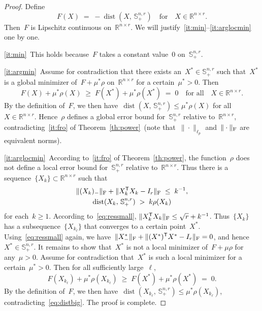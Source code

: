 \documentclass[11pt,a4paper]{article}  %
\theoremstyle{definition}
\DeclareMathOperator{\dist}{dist}
\newcommand{\RR}{\mathbb{R}}
\newcommand{\res}{\rho}
\newcommand{\penpar}{\mu}
\newcommand{\col}{r}
\newcommand{\stf}[1]{\mathbb{S}^{#1}}
\newcommand{\fro}{{\scriptstyle{\textnormal{F}}}}
\newcommand{\trs}{{\scriptstyle{\mathsf{T}}}}
\begin{document}
\begin{proof}
    Define
    \begin{equation}
        \nonumber
        F(X) \;=\; -\dist(X,\,\stf{n,\col}_+) \quad \text{for} \quad X\in\RR^{n\times \col}.
    \end{equation}
    Then~$F$ is Lipschitz continuous on~$\RR^{n\times\col}$. We will
    justify~\ref{it:min}--\ref{it:arglocmin} one by one.

    \ref{it:min}~This holds because~$F$ takes a constant value~$0$ on~$\stf{n,\col}_+$.

    \ref{it:argmin}~Assume for contradiction that there exists an~$X^*\in\stf{n,\col}_+$ such
    that~$X^*$ is a global minimizer of~$F + \penpar^* \res$ on~$\RR^{n\times \col}$
    for a certain~$\penpar^* >0$. Then
    \begin{equation}
        \nonumber
        F(X) + \penpar^* \res(X) \;\ge\; F(X^*) + \penpar^*\res(X^*) \;=\; 0
        \quad \text{for all} \quad X \in\RR^{n\times \col}.
    \end{equation}
    By the definition of~$F$, we then have~$\dist(X,\,\stf{n,\col}_+) \le \penpar^*\res(X)$ for
    all~$X \in\RR^{n\times \col}$. Hence~$\res$ defines a global error bound for~$\stf{n,\col}_+$
    relative to~$\RR^{n\times \col}$, contradicting~\ref{it:fro} of Theorem~\ref{th:power}~(note
    that~$\|\cdot\|_{\ell_p}$ and~$\|\cdot\|_\fro$ are equivalent norms).

    \ref{it:arglocmin}~According to~\ref{it:fro} of Theorem~\ref{th:power}, the function~$\res$
    does not define a local error bound for~$\stf{n,\col}_+$ relative to~$\RR^{n\times \col}$.
    Thus there is a sequence~$\{X_k\}\subset \RR^{n\times \col}$ such that%
    \begin{gather}
        \label{eq:ressmall}
        \|(X_k)_{-}\|_\fro + \|X_k^\trs X_k - I_\col\|_\fro \;\le\; k^{-1}, \\
        \label{eq:distbig} \dist(X_k,\,\stf{n,\col}_+) \;>\; k\res(X_k)
    \end{gather}
    for each~$k\ge 1$. According to~\eqref{eq:ressmall}, $\|X_k^\trs X_k\|_\fro \le \sqrt{\col} + k^{-1}$.
    Thus~$\{X_k\}$ has a subsequence~$\{X_{k_{\ell}}\}$ that converges to a certain point~$X^*$.
    Using~\eqref{eq:ressmall} again, we have~$\|X_{-}^*\|_\fro + \|(X^*)^\trs X^* -I_\col\|_\fro
    = 0$, and hence~$X^*\in\stf{n,\col}_+$. It remains to show that~$X^*$ is not a local
    minimizer of~$F+\penpar \res$ for any~$\penpar >0$. Assume for contradiction that~$X^*$ is such
    a local minimizer for a certain~$\penpar^* > 0$.
    Then for all sufficiently large~$\ell$,%
    \begin{equation}
        \nonumber
        F(X_{k_\ell}) + \penpar^* \res(X_{k_\ell}) \;\ge\; F(X^*) + \penpar^* \res(X^*) \;=\; 0.
    \end{equation}
    By the definition of~$F$, we then have~$\dist(X_{k_\ell},\,\stf{n,\col}_+) \le \penpar^* \res(X_{k_\ell})$,
    contradicting~\eqref{eq:distbig}. The proof is complete.
\end{proof}
\end{document}
